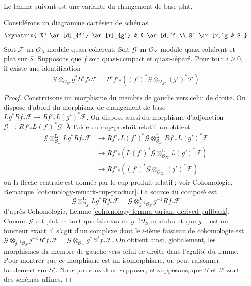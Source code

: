 \noindent
Le lemme suivant est une variante du changement de base plat.

\begin{lemma}
\label{lemma-base-change-tensor-with-flat}
Considérons un diagramme cartésien de schémas
$$
\xymatrix{
X' \ar[d]_{f'} \ar[r]_{g'} & X \ar[d]^f \\
S' \ar[r]^g & S
}
$$
Soit $\mathcal{F}$ un $\mathcal{O}_X$-module quasi-cohérent. Soit
$\mathcal{G}$ un $\mathcal{O}_{S'}$-module quasi-cohérent et plat sur $S$.
Supposons que $f$ soit quasi-compact et quasi-séparé. Pour tout $i \geq 0$, il
existe une identification
$$
\mathcal{G} \otimes_{\mathcal{O}_{S'}} g^*R^if_*\mathcal{F} =
R^if'_*\left((f')^*\mathcal{G}
\otimes_{\mathcal{O}_{X'}} (g')^*\mathcal{F}\right)
$$
\end{lemma}

\begin{proof}
Construisons un morphisme du membre de gauche vers celui de droite. On dispose
d'abord du morphisme de changement de base
$Lg^*Rf_*\mathcal{F} \to Rf'_*L(g')^*\mathcal{F}$. On dispose aussi du
morphisme d'adjonction $\mathcal{G} \to Rf'_*L(f')^*\mathcal{G}$. À l'aide du
cup-produit relatif, on obtient
\begin{align*}
\mathcal{G}
\otimes_{\mathcal{O}_{S'}}^\mathbf{L}
Lg^*Rf_*\mathcal{F}
& \to
Rf'_*L(f')^*\mathcal{G}
\otimes_{\mathcal{O}_{S'}}^\mathbf{L}
Rf'_*L(g')^*\mathcal{F} \\
& \to
Rf'_*\left(L(f')^*\mathcal{G}
\otimes_{\mathcal{O}_{X'}}^\mathbf{L}
L(g')^*\mathcal{F}\right) \\
& \to
Rf'_*\left((f')^*\mathcal{G}
\otimes_{\mathcal{O}_{X'}} (g')^*\mathcal{F}\right)
\end{align*}
où la flèche centrale est donnée par le cup-produit relatif ; voir
Cohomologie, Remarque \ref{cohomology-remark-cup-product}. La source du
composé est
$$
\mathcal{G} \otimes_{\mathcal{O}_{S'}}^\mathbf{L} Lg^*Rf_*\mathcal{F} =
\mathcal{G} \otimes_{g^{-1}\mathcal{O}_S}^\mathbf{L} g^{-1}Rf_*\mathcal{F}
$$
d'après Cohomologie, Lemme
\ref{cohomology-lemma-variant-derived-pullback}. Comme $\mathcal{G}$ est plat
en tant que faisceau de $g^{-1}\mathcal{O}_S$-modules et que $g^{-1}$ est un
foncteur exact, il s'agit d'un complexe dont le $i$-ième faisceau de
cohomologie est
$\mathcal{G} \otimes_{g^{-1}\mathcal{O}_S} g^{-1}R^if_*\mathcal{F} =
\mathcal{G} \otimes_{\mathcal{O}_{S'}} g^*R^if_*\mathcal{F}$.
On obtient ainsi, globalement, les morphismes du membre de gauche vers celui de
droite dans l'égalité du lemme. Pour montrer que ce morphisme est un
isomorphisme, on peut raisonner localement sur $S'$. Nous pouvons donc supposer,
et supposons, que $S$ et $S'$ sont des schémas affines.


\end{proof}
